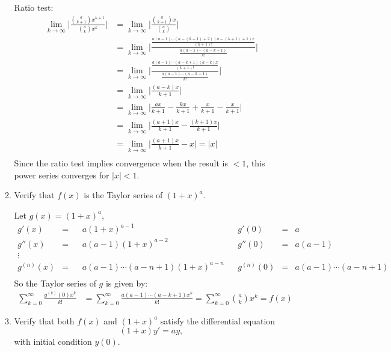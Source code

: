 \documentclass{article}
\begin{document}
\begin{enumerate}[label=(\arabic*)]
\begin{enumerate}
                Ratio test:
                \begin{align*}
                    \lim_{k\rightarrow \infty} \Bigg| \frac{\binom{a}{k+1}x^{k+1}}{\binom{a}{k}x^k} \Bigg| &= \lim_{k\rightarrow \infty} \Bigg| \frac{\binom{a}{k+1}x}{\binom{a}{k}} \Bigg| \\
                    &= \lim_{k\rightarrow \infty} \Bigg| \frac{\frac{a(a-1)\cdots(a-(k+1) +2)(a-(k+1)+1)x}{(k+1)!}}{\frac{a(a-1)\cdots(a-k+1)}{k!}} \Bigg| \\
                    &= \lim_{k\rightarrow \infty} \Bigg| \frac{\frac{a(a-1)\cdots(a-k + 1)(a-k)x}{(k+1)!}}{\frac{a(a-1)\cdots(a-k+1)}{k!}} \Bigg| \\
                    &= \lim_{k\rightarrow \infty} \Bigg| \frac{(a-k)x}{k+1} \Bigg| \\
                    &= \lim_{k\rightarrow \infty} \Bigg| \frac{ax}{k+1} - \frac{kx}{k+1} + \frac{x}{k+1} - \frac{x}{k+1} \Bigg| \\
                    &= \lim_{k\rightarrow \infty} \Bigg| \frac{(a + 1)x}{k+1} - \frac{(k + 1)x}{k+1} \Bigg| \\
                    &= \lim_{k\rightarrow \infty} \Bigg| \frac{(a + 1)x}{k+1} - x \Bigg| = |x| \\ 
                \end{align*}
                Since the ratio test implies convergence when the result is $<1$, this power series converges for $|x| < 1$.
            \item Verify that $f(x)$ is the Taylor series of $(1 + x)^a$.
                
                Let $g(x) = (1+x)^a$,
                \begin{align*}
                    g'(x) &=&&a(1 + x)^{a-1}& &g'(0) &=& a\\
                    g''(x)&=&&a(a-1)(1+x)^{a-2}& &g''(0)&=& a(a-1)\\ 
                    \vdots \\ 
                    g^{(n)}(x)&=&&a(a-1)\cdots(a-n+1)(1+x)^{a-n}& &g^{(n)}(0)&=& a(a-1)\cdots(a-n+1)\\ 
                \end{align*}
                So the Taylor series of $g$ is given by:
                \begin{align*}
                    \sum_{k=0}^{\infty}\frac{g^{(k)}(0)x^k}{k!} &= \sum_{k=0}^{\infty}\frac{a(a-1)\cdots(a-k+1)x^k}{k!} = \sum_{k=0}^{\infty} \binom{a}{k}x^k = f(x)
                \end{align*}
            \item Verify that both $f(x)$ and $(1 + x)^a$ satisfy the differential equation
        \[(1+x)y' = ay,\] with initial condition $y(0)$.
                

\end{enumerate}
\end{enumerate}
\end{document}
